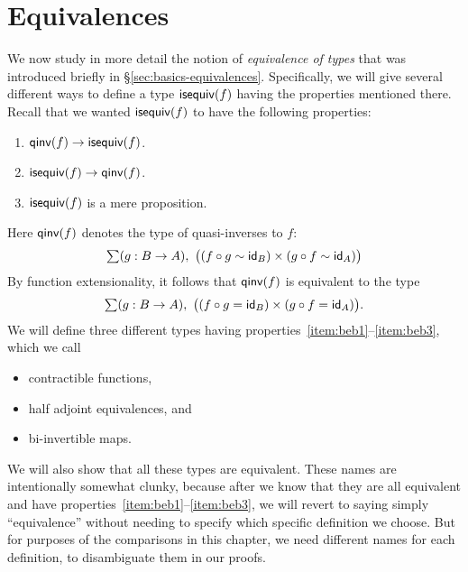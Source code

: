 \newcommand{\lcoh}[3]{\mathtt{cohl}_{#1, #2, #3}}
\newcommand{\rcoh}[3]{\mathtt{cohr}_{#1, #2, #3}}
\newcommand{\lin}[1]{\mathtt{linv}_{#1}}
\newcommand{\rin}[1]{\mathtt{rinv}_{#1}}
\newcommand{\hfib}[2]{\mathtt{fib}_{#1,#2}}

\chapter{Equivalences}
\label{cha:equivalences}

We now study in more detail the notion of \emph{equivalence of types} that was introduced briefly in \S\ref{sec:basics-equivalences}.
Specifically, we will give several different ways to define a type $\mathsf{isequiv}(f)$ having the properties mentioned there.
Recall that we wanted $\mathsf{isequiv}(f)$ to have the following properties:
\begin{enumerate}
\item $\mathsf{qinv}(f) \to \mathsf{isequiv} (f)$.\label{item:beb1}
\item $\mathsf{isequiv} (f) \to \mathsf{qinv}(f)$.\label{item:beb2}
\item $\mathsf{isequiv}(f)$ is a mere proposition.\label{item:beb3}
\end{enumerate}
Here $\mathsf{qinv}(f)$ denotes the type of quasi-inverses to $f$:
\begin{equation*}
  \sm{g:B\to A} \big((f \circ g \htpy \idfunc[B]) \times (g\circ f \htpy \idfunc[A])\big)
\end{equation*}
By function extensionality, it follows that $\mathsf{qinv}(f)$ is equivalent to the type
\begin{equation*}
  \sm{g:B\to A} \big((f \circ g = \idfunc[B]) \times (g\circ f = \idfunc[A])\big).
\end{equation*}
We will define three different types having properties~\ref{item:beb1}--\ref{item:beb3}, which we call
\begin{itemize}
\item contractible functions,
\item half adjoint equivalences, and
\item bi-invertible maps.
\end{itemize}
We will also show that all these types are equivalent.
These names are intentionally somewhat clunky, because after we know that they are all equivalent and have properties~\ref{item:beb1}--\ref{item:beb3}, we will revert to saying simply ``equivalence'' without needing to specify which specific definition we choose.
But for purposes of the comparisons in this chapter, we need different names for each definition, to disambiguate them in our proofs.

